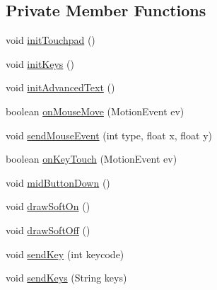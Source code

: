 \subsection*{\-Private \-Member \-Functions}
\begin{DoxyCompactItemize}
\item 
void \hyperlink{classcom_1_1_cyberpad_1_1_reroot_1_1_pad_activity_ae0add29aea70f334bb92d19842ffe639}{init\-Touchpad} ()
\item 
void \hyperlink{classcom_1_1_cyberpad_1_1_reroot_1_1_pad_activity_a49055223a318b69644dad7ca971ccae1}{init\-Keys} ()
\item 
void \hyperlink{classcom_1_1_cyberpad_1_1_reroot_1_1_pad_activity_af00be832504901d903962f8383ffad17}{init\-Advanced\-Text} ()
\item 
boolean \hyperlink{classcom_1_1_cyberpad_1_1_reroot_1_1_pad_activity_ad79ea1e2b65694c6bcedeaa0321cf24d}{on\-Mouse\-Move} (\-Motion\-Event ev)
\item 
void \hyperlink{classcom_1_1_cyberpad_1_1_reroot_1_1_pad_activity_a51739f8a2ea58ddbd183b823b9664c8b}{send\-Mouse\-Event} (int type, float x, float y)
\item 
boolean \hyperlink{classcom_1_1_cyberpad_1_1_reroot_1_1_pad_activity_aced64c49d953e06e0917fd557acfacfc}{on\-Key\-Touch} (\-Motion\-Event ev)
\item 
void \hyperlink{classcom_1_1_cyberpad_1_1_reroot_1_1_pad_activity_a4413075ba9349cf76540c3ed6657abd8}{mid\-Button\-Down} ()
\item 
void \hyperlink{classcom_1_1_cyberpad_1_1_reroot_1_1_pad_activity_ad7db680ba3717d2f76ca2210001a583b}{draw\-Soft\-On} ()
\item 
void \hyperlink{classcom_1_1_cyberpad_1_1_reroot_1_1_pad_activity_a4e5687c758092441d2d8153f5e505667}{draw\-Soft\-Off} ()
\item 
void \hyperlink{classcom_1_1_cyberpad_1_1_reroot_1_1_pad_activity_a14d4025724548a2b473dc80662ae1dd9}{send\-Key} (int keycode)
\item 
void \hyperlink{classcom_1_1_cyberpad_1_1_reroot_1_1_pad_activity_a26737c82a45668395e447f558c49e26f}{send\-Keys} (\-String keys)
\end{DoxyCompactItemize}
